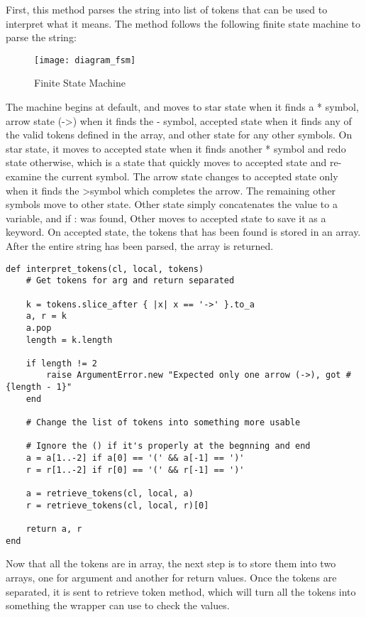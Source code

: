 First, this method parses the string into list of tokens that can be used to interpret what it means.  The method follows the following finite state machine to parse the string:

\begin{figure}[h]
\caption{Finite State Machine}
\texttt{[image: diagram\_fsm]}
\centering
\end{figure}

The machine begins at default, and moves to star state when it finds a {*} symbol, arrow state ({-}\textgreater) when it finds the {-} symbol, accepted state when it finds any of the valid tokens defined in the array, and other state for any other symbols.  On star state, it moves to accepted state when it finds another {*} symbol and redo state otherwise, which is a state that quickly moves to accepted state and re-examine the current symbol.  The arrow state changes to accepted state only when it finds the \textgreater symbol which completes the arrow.  The remaining other symbols move to other state.  Other state simply concatenates the value to a variable, and if {:} was found, Other moves to accepted state to save it as a keyword.  On accepted state, the tokens that has been found is stored in an array.  After the entire string has been parsed, the array is returned.

\begin{lstlisting}[caption={Interpreter method}]
def interpret_tokens(cl, local, tokens)
    # Get tokens for arg and return separated

    k = tokens.slice_after { |x| x == '->' }.to_a
    a, r = k
    a.pop
    length = k.length

    if length != 2
        raise ArgumentError.new "Expected only one arrow (->), got #{length - 1}"
    end

    # Change the list of tokens into something more usable

    # Ignore the () if it's properly at the begnning and end
    a = a[1..-2] if a[0] == '(' && a[-1] == ')'
    r = r[1..-2] if r[0] == '(' && r[-1] == ')'

    a = retrieve_tokens(cl, local, a)
    r = retrieve_tokens(cl, local, r)[0]

    return a, r
end
\end{lstlisting}

Now that all the tokens are in array, the next step is to store them into two arrays, one for argument and another for return values.  Once the tokens are separated, it is sent to retrieve token method, which will turn all the tokens into something the wrapper can use to check the values.

